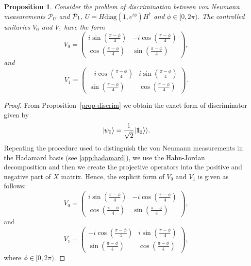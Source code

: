 \documentclass[preprint,12pt, a4paper, dvipsnames]{elsarticle}
\newcommand{\ket}[1]{\ensuremath{|#1\rangle}}
\newcommand{\1}{{\rm 1\hspace{-0.9mm}l}}
\newcommand{\Id}{{\rm 1\hspace{-0.9mm}l}}
\newcommand{\PP}{\mathcal{P}}
\newcommand{\diag}{\mathrm{diag}}
\newtheorem{proposition}{Proposition}
\theoremstyle{definition}
\begin{document}
\begin{proposition}\label{prop:optimal-measurement}
	Consider the problem of discrimination between von Neumann measurements $\PP_U$
	and $\PP_\1$, $U = H\diag(1, e^{i \phi}) H^\dagger $ and $\phi \in [0,
	2\pi)$.
	The   controlled unitaries $V_0$ and $V_1$
	have the form
	\begin{equation}
	V_0 = \left(\begin{array}{cc}i \sin\left( \frac{\pi - \phi}{4} \right)&-i
	\cos\left( \frac{\pi - \phi}{4} \right)\\ \cos\left( \frac{\pi -
		\phi}{4}\right)& \sin\left( \frac{\pi - \phi}{4} \right)\end{array}\right),
	\end{equation}
	and
	\begin{equation}
	V_1 = \left(\begin{array}{cc}-i \cos\left(\frac{\pi - \phi}{4}\right) &i
	\sin\left( \frac{\pi - \phi}{4}\right)\\\sin\left( \frac{\pi - \phi}{4} \right)
	&  \cos\left( \frac{\pi - \phi}{4} \right) \end{array}\right).
	\end{equation}
\end{proposition}

\begin{proof}
	From Proposition~\ref{prop-discrim} we obtain the exact form of discriminator given by
	\begin{equation}
	\ket{\psi_0}  = \frac{1}{\sqrt{2}} |\Id_2
	\rangle \rangle.
	\end{equation}
	Repeating the procedure used to distinguish the von Neumann measurements in the Hadamard basis (see \ref{app:hadamard}), we use the Hahn-Jordan decomposition and then we create the projective operators into the positive and negative part of $X$ matrix.
	Hence, the explicit form of $V_0$ and $V_1$ is given as
	follows:
	\begin{equation}
	V_0 = \left(
	\begin{array}{cc}i \sin\left( \frac{\pi - \phi}{4} \right)&-i
	\cos\left( \frac{\pi - \phi}{4} \right)\\ \cos\left( \frac{\pi -
		\phi}{4}\right)& \sin\left( \frac{\pi - \phi}{4} \right)
	\end{array}
	\right),
	\end{equation}
and
	\begin{equation}
	V_1 = \left(\begin{array}{cc}-i \cos\left(\frac{\pi - \phi}{4}\right) &i
	\sin\left( \frac{\pi - \phi}{4}\right)\\\sin\left( \frac{\pi - \phi}{4}
	\right) &  \cos\left( \frac{\pi - \phi}{4} \right) \end{array}\right),
	\end{equation}
	where $\phi \in [0,2\pi)$.
\end{proof}
\end{document}
